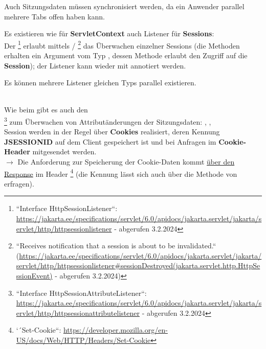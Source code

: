 \begin{tcolorbox}[enlarge top by=0.5cm,enlarge bottom by=0.5cm]
Auch Sitzungsdaten müssen synchronisiert werden, da ein Anwender parallel mehrere Tabs offen haben kann.\\
\end{tcolorbox}

\noindent
Es existieren wie für \textbf{ServletContext} auch Listener für \textbf{Sessions}:\\
Der \footnote{
    ``Interface HttpSessionListener``: \url{https://jakarta.ee/specifications/servlet/6.0/apidocs/jakarta.servlet/jakarta/servlet/http/httpsessionlistener} - abgerufen 3.2.2024
} erlaubt mittels  / \footnote{``Receives notification that a session is about to be invalidated.`` (\url{https://jakarta.ee/specifications/servlet/6.0/apidocs/jakarta.servlet/jakarta/servlet/http/httpsessionlistener#sessionDestroyed(jakarta.servlet.http.HttpSessionEvent)} - abgerufen 3.2.2024)} das Überwachen einzelner Sessions (die Methoden erhalten ein Argument vom Typ , dessen Methode  erlaubt den Zugriff auf die \textbf{Session}); der Listener kann wieder mit  annotiert werden.

\begin{tcolorbox}[enlarge top by=0.5cm,enlarge bottom by=0.5cm]
Es können mehrere Listener gleichen Typs parallel existieren.
\end{tcolorbox}\\

\noindent
Wie beim   gibt es auch den\\ \footnote{``Interface HttpSessionAttributeListener``: \url{https://jakarta.ee/specifications/servlet/6.0/apidocs/jakarta.servlet/jakarta/servlet/http/httpsessionattributelistener} - abgerufen 3.2.2024
} zum Überwachen von Attributänderungen der Sitzungsdaten: , , \\

\noindent
Session werden in der Regel über \textbf{Cookies} realisiert, deren Kennung\\ \textbf{JSESSIONID} auf dem Client gespeichert ist und bei Anfragen im \textbf{Cookie-Header} mitgesendet werden.\\
$\rightarrow$ Die Anforderung zur Speicherung der Cookie-Daten kommt \ul{über den Response} im Header \footnote{
    `´Set-Cookie``: \url{https://developer.mozilla.org/en-US/docs/Web/HTTP/Headers/Set-Cookie}
} (die Kennung lässt sich auch über die Methode  von  erfragen).\\


